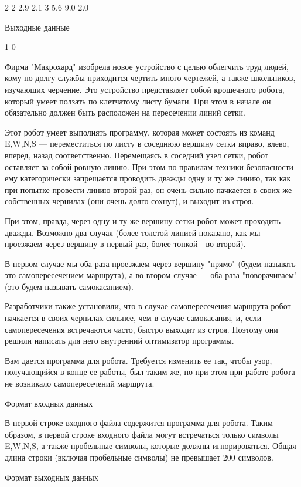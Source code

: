 \documentclass[]{article}
\begin{document}
2
2 2.9 2.1
3 5.6 9.0 2.0

Выходные данные

1
0



Фирма "Макрохард" изобрела новое устройство с целью облегчить труд людей, кому по долгу службы приходится чертить много чертежей, а также школьников, изучающих черчение. Это устройство представляет собой крошечного робота, который умеет ползать по клетчатому листу бумаги. При этом в начале он обязательно должен быть расположен на пересечении линий сетки.

Этот робот умеет выполнять программу, которая может состоять из команд E,W,N,S — переместиться по листу в соседнюю вершину сетки вправо, влево, вперед, назад соответственно. Перемещаясь в соседний узел сетки, робот оставляет за собой ровную линию. При этом по правилам техники безопасности ему категорически запрещается проводить дважды одну и ту же линию, так как при попытке провести линию второй раз, он очень сильно пачкается в своих же собственных чернилах (они очень долго сохнут), и выходит из строя.

При этом, правда, через одну и ту же вершину сетки робот может проходить дважды. Возможно два случая (более толстой линией показано, как мы проезжаем через вершину в первый раз, более тонкой - во второй).

В первом случае мы оба раза проезжаем через вершину "прямо" (будем называть это самопересечением маршрута), а во втором случае — оба раза "поворачиваем" (это будем называть самокасанием).

Разработчики также установили, что в случае самопересечения маршрута робот пачкается в своих чернилах сильнее, чем в случае самокасания, и, если самопересечения встречаются часто, быстро выходит из строя. Поэтому они решили написать для него внутренний оптимизатор программы.

Вам дается программа для робота. Требуется изменить ее так, чтобы узор, получающийся в конце ее работы, был таким же, но при этом при работе робота не возникало самопересечений маршрута.

Формат входных данных

В первой строке входного файла содержится программа для робота. Таким образом, в первой строке входного файла могут встречаться только символы E,W,N,S, а также пробельные символы, которые должны игнорироваться. Общая длина строки (включая пробельные символы) не превышает 200 символов.

Формат выходных данных
\end{document}
